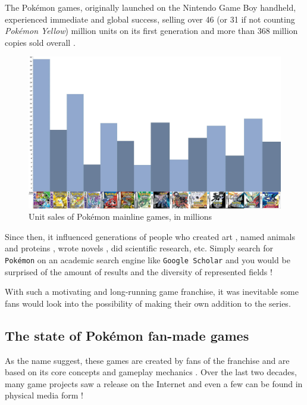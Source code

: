 \documentclass[11pt]{article}
\begin{document}
The Pokémon games, originally launched on the Nintendo Game Boy handheld, experienced immediate and global success, selling over 46 (or 31 if not counting \textit{Pokémon Yellow}) million units on its first generation \cite{PkmnSales} and more than 368 million copies sold overall \cite{PkmnFigures}.

\begin{figure}[!h]
	\centering
	\includegraphics[width=\textwidth]{Pokemon_sales_gen}
	\caption{Unit sales of Pokémon mainline games, in millions \cite{PkmnSales,PkmnSalesIll} }
\end{figure}

Since then, it influenced generations of people who created art \cite{PkmnArt}, named animals and proteins \cite{Pikachurin,Etymology}, wrote novels \cite{Novel}, did scientific research, etc. Simply search for \texttt{Pokémon} on an academic search engine like \texttt{Google Scholar} and you would be surprised of the amount of results and the diversity of represented fields !

With such a motivating and long-running game franchise, it was inevitable some fans would look into the possibility of making their own addition to the series.

\subsection{The state of Pokémon fan-made games}

As the name suggest, these games are created by fans of the franchise and are based on its core concepts and gameplay mechanics \cite{PkmnFangames}. Over the last two decades, many game projects saw a release on the Internet and even a few can be found in physical media form \cite{PkmnUV,PkmnCartridge} !
\end{document}
